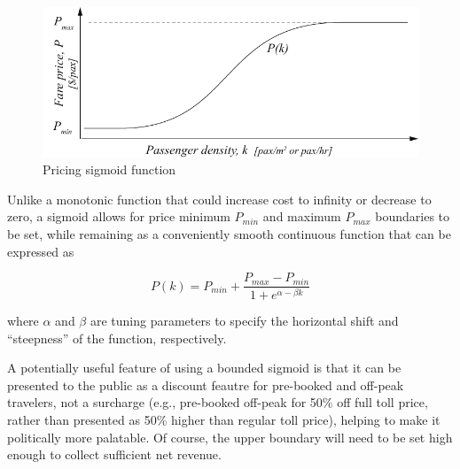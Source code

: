 \documentclass{article}
\begin{document}
\begin{figure}[h]
	\includegraphics[width=0.75\linewidth]{figures/costdensity}
	\centering
	\caption{Pricing sigmoid function}
	\label{fig:costflow}
\end{figure}

\noindent Unlike a monotonic function that could increase cost to infinity or decrease to zero, a sigmoid allows for price minimum $P_{min}$ and maximum $P_{max}$ boundaries to be set, while remaining as a conveniently smooth continuous function that can be expressed as

\begin{equation}
P(k) = P_{min} + \frac{P_{max} - P_{min}}{1 + e^{\alpha - \beta k}}
\label{eq:price}
\end{equation}

\noindent where $\alpha$ and $\beta$ are tuning parameters to specify the horizontal shift and ``steepness'' of the function, respectively. 

A potentially useful feature of using a bounded sigmoid is that it can be presented to the public as a discount feautre for pre-booked and off-peak travelers, not a surcharge (e.g., pre-booked off-peak for 50\% off full toll price, rather than presented as 50\% higher than regular toll price), helping to make it politically more palatable. Of course, the upper boundary will need to be set high enough to collect sufficient net revenue.
\end{document}
